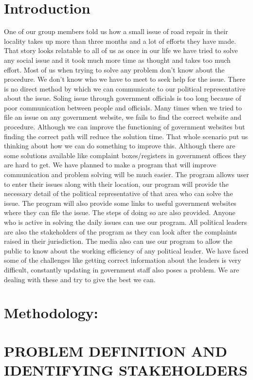 \documentclass[acmtog]{acmart}
\begin{document}
\section*{Introduction}
One of our group members told us how a small issue of road repair in their locality takes up more than three months and a lot of efforts they have made. That story looks relatable to all of us as once in our life we have tried to solve any social issue and it took much more time as thought and takes too much effort. Most of us when trying to solve any problem don’t know about the procedure. We don’t know who we have to meet to seek help for the issue. There is no direct method by which we can communicate to our political representative about the issue. Soling issue through government officials is too long because of poor communication between people and officials. Many times when we tried to file an issue on any government website, we fails to find the correct website and procedure. Although we can improve the functioning of government websites but finding the correct path will reduce the solution time. That whole scenario put us thinking about how we can do something to improve this. Although there are some solutions available like complaint boxes/registers in government offices they are hard to get. We have planned to make a program that will improve communication and problem solving will be much easier. The program allows user to enter their issues along with their location, our program will provide the necessary detail of the political representative of that area who can solve the issue. The program will also provide some links to useful government websites where they can file the issue. The steps of doing so are also provided. Anyone who is active in solving the daily issues can use our program. All political leaders are also the stakeholders of the program as they can look after the complaints raised in their jurisdiction. The media also can use our program to allow the public to know about the working efficiency of any political leader. We have faced some of the challenges like getting correct information about the leaders is very difficult, constantly updating in government staff also poses a problem. We are dealing with these and try to give the best we can.

\section*{Methodology:}
\section{PROBLEM DEFINITION AND IDENTIFYING STAKEHOLDERS}
\end{document}
